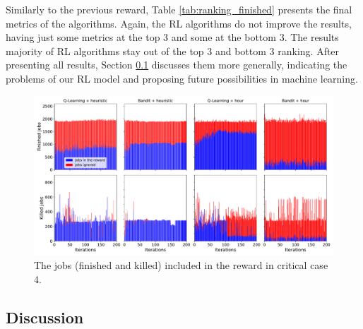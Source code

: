 Similarly to the previous reward, Table \ref{tab:ranking_finished} presents the final metrics of the algorithms. Again, the RL algorithms do not improve the results, having just some metrics at the top 3 and some at the bottom 3. The results majority of RL algorithms stay out of the top 3 and bottom 3 ranking. After presenting all results, Section \ref{sec:learning_discussion} discusses them more generally, indicating the problems of our RL model and proposing future possibilities in machine learning.

\clearpage

\begin{figure}[!htb]
    \centering
    \includegraphics[scale=0.33]{Images/Learning_compensations/ignored_jobs_touched_scenario_4.pdf}
    \caption{The jobs (finished and killed) included in the reward in critical case 4.}
    \label{fig:reward_from_jobs_critical_4}
\end{figure}

\subsection{Discussion}
\label{sec:learning_discussion}

